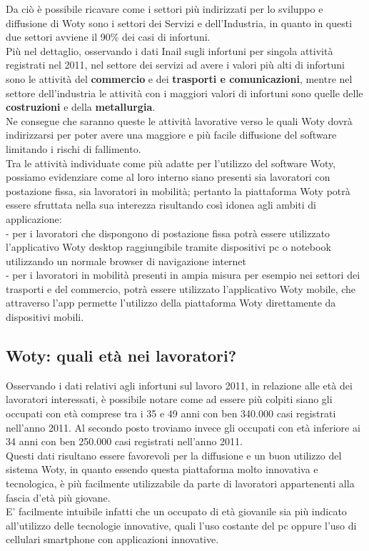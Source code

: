 Da ciò è possibile ricavare come i settori più indirizzati per lo sviluppo e diffusione di Woty sono i settori dei Servizi e dell'Industria, in quanto in questi due settori avviene il 90\% dei casi di infortuni.\\
Più nel dettaglio, osservando i dati Inail sugli infortuni per singola attività registrati nel 2011, nel settore dei servizi ad avere i valori più alti di infortuni sono le attività del \textbf{commercio} e dei \textbf{trasporti e comunicazioni}, mentre nel settore dell'industria le attività con i maggiori valori di infortuni sono quelle delle \textbf{costruzioni} e della \textbf{metallurgia}.\\
Ne consegue che saranno queste le attività lavorative verso le quali Woty dovrà indirizzarsi per poter avere una maggiore e più facile diffusione del software limitando i rischi di fallimento.\\


Tra le attività individuate come più adatte per l'utilizzo del software Woty, possiamo evidenziare come al loro interno siano presenti sia lavoratori con postazione fissa, sia lavoratori in mobilità; pertanto la piattaforma Woty potrà essere sfruttata nella sua interezza risultando così idonea agli ambiti di applicazione:\\
- per i lavoratori che dispongono di postazione fissa potrà essere utilizzato l'applicativo Woty desktop raggiungibile tramite dispositivi pc o notebook utilizzando un normale browser di navigazione internet\\
- per i lavoratori in mobilità presenti in ampia misura per esempio nei settori dei trasporti e del commercio, potrà essere utilizzato l'applicativo Woty mobile, che attraverso l'app permette l'utilizzo della piattaforma Woty direttamente da dispositivi mobili.



\subsection{Woty: quali età nei lavoratori?}
Osservando i dati relativi agli infortuni sul lavoro 2011, in relazione alle età dei lavoratori interessati, è possibile notare come ad essere più colpiti siano gli occupati con età comprese tra i 35 e 49 anni con ben 340.000 casi registrati nell'anno 2011.
Al secondo posto troviamo invece gli occupati con età inferiore ai 34 anni con ben 250.000 casi registrati nell'anno 2011.\\
Questi dati risultano essere favorevoli per la diffusione e un buon utilizzo del sistema Woty, in quanto essendo questa piattaforma molto innovativa e tecnologica, è più facilmente utilizzabile da parte di lavoratori appartenenti alla fascia d'età più giovane.\\
E' facilmente intuibile infatti che un occupato di età giovanile sia più indicato all'utilizzo delle tecnologie innovative, quali l'uso costante del pc oppure l'uso di cellulari smartphone con applicazioni innovative.



